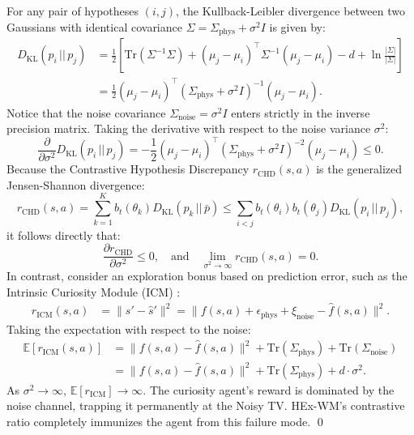 For any pair of hypotheses $(i, j)$, the Kullback-Leibler divergence between two Gaussians with identical covariance $\Sigma = \Sigma_{\text{phys}} + \sigma^2 I$ is given by:
\begin{align}
    D_{\text{KL}}\left( p_i \,||\, p_j \right) &= \frac{1}{2} \left[ \text{Tr}\left(\Sigma^{-1} \Sigma\right) + (\mu_j - \mu_i)^\top \Sigma^{-1} (\mu_j - \mu_i) - d + \ln\frac{|\Sigma|}{|\Sigma|} \right] \nonumber \\
    &= \frac{1}{2} (\mu_j - \mu_i)^\top \left( \Sigma_{\text{phys}} + \sigma^2 I \right)^{-1} (\mu_j - \mu_i).
\end{align}
Notice that the noise covariance $\Sigma_{\text{noise}} = \sigma^2 I$ enters strictly in the inverse precision matrix. Taking the derivative with respect to the noise variance $\sigma^2$:
\begin{equation}
    \frac{\partial}{\partial \sigma^2} D_{\text{KL}}\left( p_i \,||\, p_j \right) = -\frac{1}{2} (\mu_j - \mu_i)^\top \left( \Sigma_{\text{phys}} + \sigma^2 I \right)^{-2} (\mu_j - \mu_i) \le 0.
\end{equation}
Because the Contrastive Hypothesis Discrepancy $r_{\text{CHD}}(s, a)$ is the generalized Jensen-Shannon divergence:
\begin{equation}
    r_{\text{CHD}}(s, a) = \sum_{k=1}^K b_t(\theta_k) D_{\text{KL}}\left( p_k \,||\, \bar{p} \right) \le \sum_{i < j} b_t(\theta_i) b_t(\theta_j) D_{\text{KL}}(p_i \,||\, p_j),
\end{equation}
it follows directly that:
\begin{equation}
    \frac{\partial r_{\text{CHD}}}{\partial \sigma^2} \le 0, \quad \text{and} \quad \lim_{\sigma^2 \to \infty} r_{\text{CHD}}(s, a) = 0.
\end{equation}
In contrast, consider an exploration bonus based on prediction error, such as the Intrinsic Curiosity Module (ICM) \citep{pathak2017curiosity}:
\begin{align}
    r_{\text{ICM}}(s, a) &= \| s' - \hat{s}' \|^2 = \| f(s, a) + \epsilon_{\text{phys}} + \xi_{\text{noise}} - \hat{f}(s, a) \|^2.
\end{align}
Taking the expectation with respect to the noise:
\begin{align}
    \mathbb{E}[r_{\text{ICM}}(s, a)] &= \| f(s, a) - \hat{f}(s, a) \|^2 + \text{Tr}(\Sigma_{\text{phys}}) + \text{Tr}(\Sigma_{\text{noise}}) \nonumber \\
    &= \| f(s, a) - \hat{f}(s, a) \|^2 + \text{Tr}(\Sigma_{\text{phys}}) + d \cdot \sigma^2.
\end{align}
As $\sigma^2 \to \infty$, $\mathbb{E}[r_{\text{ICM}}] \to \infty$. The curiosity agent's reward is dominated by the noise channel, trapping it permanently at the Noisy TV. HEx-WM's contrastive ratio completely immunizes the agent from this failure mode. \qed

